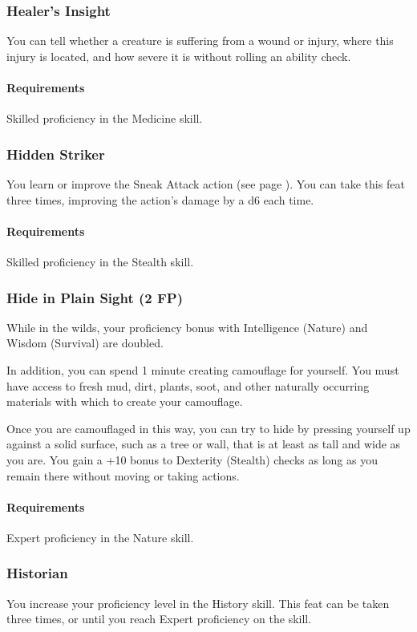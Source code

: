 \subsubsection{Healer's Insight} \label{feat::healersinsight}
    You can tell whether a creature is suffering from a wound or injury, where this injury is located, and how severe it is without rolling an ability check.
    \paragraph{Requirements} Skilled proficiency in the Medicine skill.
\subsubsection{Hidden Striker} \label{feat::hiddenstriker}
    You learn or improve the Sneak Attack action (see page \pageref{act:sneakattack}).
    You can take this feat three times, improving the action's damage by a d6 each time.
    \paragraph{Requirements} Skilled proficiency in the Stealth skill.
\subsubsection{Hide in Plain Sight (2 FP)} \label{feat::hideinplainsight}
    While in the wilds, your proficiency bonus with Intelligence (Nature) and Wisdom (Survival) are doubled.

    In addition, you can spend 1 minute creating camouflage for yourself.
    You must have access to fresh mud, dirt, plants, soot, and other naturally occurring materials with which to create your camouflage.

    Once you are camouflaged in this way, you can try to hide by pressing yourself up against a solid surface, such as a tree or wall, that is at least as tall and wide as you are.
    You gain a +10 bonus to Dexterity (Stealth) checks as long as you remain there without moving or taking actions.
    \paragraph{Requirements} Expert proficiency in the Nature skill.
\subsubsection{Historian} \label{feat::historian}
    You increase your proficiency level in the History skill.
    This feat can be taken three times, or until you reach Expert proficiency on the skill.
